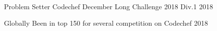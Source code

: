 \begin{cvhonors}

\cvhonor
{Problem Setter} %
{Codechef December Long Challenge 2018 Div.1} %
{} %
{2018} %


\cvhonor
{Globally} %
{Been in top 150 for several competition on Codechef} %
{} %
{2018} %










\end{cvhonors}